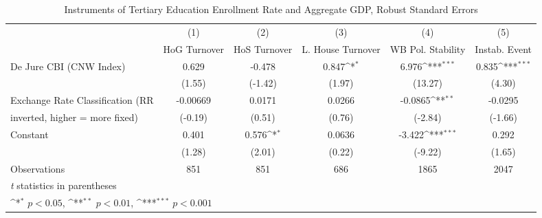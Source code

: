 \begin{table}[htbp]\centering
\def\sym#1{\ifmmode^{#1}\else\(^{#1}\)\fi}
\caption{Instruments of Tertiary Education Enrollment Rate and Aggregate GDP, Robust Standard Errors \label{ifivs}}
\begin{tabular}{l*{5}{c}}
\toprule
                                        &\multicolumn{1}{c}{(1)}&\multicolumn{1}{c}{(2)}&\multicolumn{1}{c}{(3)}&\multicolumn{1}{c}{(4)}&\multicolumn{1}{c}{(5)}\\
                                        &\multicolumn{1}{c}{HoG Turnover}&\multicolumn{1}{c}{HoS Turnover}&\multicolumn{1}{c}{L. House Turnover}&\multicolumn{1}{c}{WB Pol. Stability}&\multicolumn{1}{c}{Instab. Event}\\
\midrule
De Jure CBI (CNW Index)                 &    0.629         &   -0.478         &    0.847\sym{*}  &    6.976\sym{***}&    0.835\sym{***}\\
                                        &   (1.55)         &  (-1.42)         &   (1.97)         &  (13.27)         &   (4.30)         \\
\addlinespace
Exchange Rate Classification (RR        & -0.00669         &   0.0171         &   0.0266         &  -0.0865\sym{**} &  -0.0295         \\
inverted, higher = more fixed)          &  (-0.19)         &   (0.51)         &   (0.76)         &  (-2.84)         &  (-1.66)         \\
\addlinespace
Constant                                &    0.401         &    0.576\sym{*}  &   0.0636         &   -3.422\sym{***}&    0.292         \\
                                        &   (1.28)         &   (2.01)         &   (0.22)         &  (-9.22)         &   (1.65)         \\
\midrule
Observations                            &      851         &      851         &      686         &     1865         &     2047         \\
\bottomrule
\multicolumn{6}{l}{\footnotesize \textit{t} statistics in parentheses}\\
\multicolumn{6}{l}{\footnotesize \sym{*} \(p<0.05\), \sym{**} \(p<0.01\), \sym{***} \(p<0.001\)}\\
\end{tabular}
\end{table}
